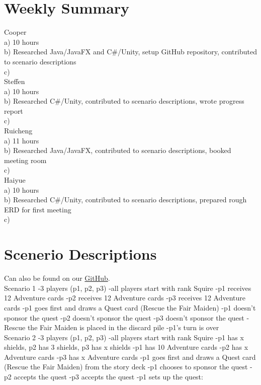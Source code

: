 \documentclass[12pt]{article} %
\begin{document}
\section*{Weekly Summary} %

Cooper\\
a) 10 hours\\
b) Researched Java/JavaFX and C\#/Unity, setup GitHub repository, contributed to scenario descriptions\\
c) \\

Steffen \\
a) 10 hours\\
b) Researched C\#/Unity, contributed to scenario descriptions, wrote progress report \\
c) \\

Ruicheng \\
a) 11 hours\\
b) Researched Java/JavaFX, contributed to scenario descriptions, booked meeting room \\
c) \\

Haiyue \\
a) 10 hours \\
b) Researched C\#/Unity, contributed to scenario descriptions, prepared rough ERD for first meeting \\
c) \\

\section*{Scenerio Descriptions}

Can also be found on our \href{https://github.com/cdj2112/FXTest/blob/master/progress_reports/progress_report_1}{GitHub}. \\

\bgroup\obeylines
Scenario 1
-3 players (p1, p2, p3)
-all players start with rank Squire
-p1 receives 12 Adventure cards
-p2 receives 12 Adventure cards
-p3 receives 12 Adventure cards
-p1 goes first and draws a Quest card (Rescue the Fair Maiden)
-p1 doesn't sponsor the quest
-p2 doesn't sponsor the quest
-p3 doesn't sponsor the quest
-Rescue the Fair Maiden is placed in the discard pile
-p1's turn is over\\

Scenario 2
-3 players (p1, p2, p3)
-all players start with rank Squire
-p1 has x shields, p2 has 3 shields, p3 has x shields
-p1 has 10 Adventure cards
-p2 has x Adventure cards
-p3 has x Adventure cards
-p1 goes first and draws a Quest card (Rescue the Fair Maiden) from the story deck
-p1 chooses to sponsor the quest
-p2 accepts the quest
-p3 accepts the quest
-p1 sets up the quest:\\
\end{document}
